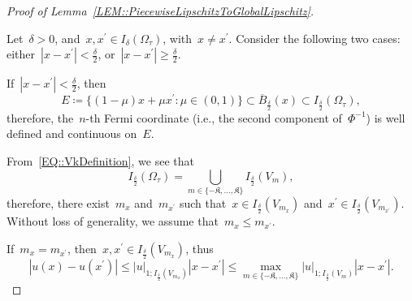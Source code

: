\documentclass[12pt,a4paper]{amsart}
\makeatletter
\numberwithin{equation}{section}
\theoremstyle{definition}
\theoremstyle{remark}
\newcommand{\abs}[1]{\left\lvert#1\right\rvert}
\renewcommand{\leq}{\leqslant}
\renewcommand{\geq}{\geqslant}
\newcommand{\prooflabel}[2]{%
  \def\@currentlabelname{#2}%
  \label{#1}%
}
\makeatother
\begin{document}
\begin{appendix}
\begin{proof}[Proof of Lemma~\ref{LEM::PiecewiseLipschitzToGlobalLipschitz}]\prooflabel{PRF::PiecewiseLipschitzToGlobalLipschitz}{Proof of Lemma~\ref{LEM::PiecewiseLipschitzToGlobalLipschitz}}
    Let~$\delta > 0$, and~$x,x^\prime \in I_\delta(\Omega_\tau)$, with~$x \neq x^\prime$. Consider the following two cases: either~$\abs{x-x^\prime} < \frac{\delta}{2}$, or~$\abs{x-x^\prime} \geq \frac{\delta}{2}$.

    If~$\abs{x-x^\prime} < \frac{\delta}{2}$, then
    \begin{equation}\label{EQ::SegmentIsInOmegaDeltaLipschitz}
        E \coloneq \bigg\{(1-\mu)x + \mu x^\prime \colon \mu \in (0,1)\bigg\} \subset \overline{B}_{\frac{\delta}{2}}(x) \subset I_{\frac{\delta}{2}}(\Omega_\tau),
    \end{equation}
    therefore, the~$n$-th Fermi coordinate (i.e., the second component of~$\Phi^{-1}$) is well defined and continuous on~$E$.

    From~\eqref{EQ::VkDefinition}, we see that
    \begin{equation}\label{EQ::OmegaDeltaVkPartitionLipschitz}
        I_{\frac{\delta}{2}}(\Omega_\tau) = \bigcup_{m \in \{-\mathfrak{K}, \dots, \mathfrak{K}\}}I_{\frac{\delta}{2}}(V_m),
    \end{equation}
    therefore, there exist~$m_x$ and~$m_{x^\prime}$ such that~$x \in I_{\frac{\delta}{2}}(V_{m_x})$ and~$x^\prime \in I_{\frac{\delta}{2}}(V_{m_{x^\prime}})$. Without loss of generality, we assume that~$m_x \leq m_{x^\prime}$.

    If~$m_x = m_{x^\prime}$, then~$x,x^\prime \in I_{\frac{\delta}{2}}(V_{m_x})$, thus
    \begin{equation}\label{EQ::xxPrimeNearSameVkLipschitz}
        \abs{u(x)-u(x^\prime)} \leq \abs{u}_{1; I_{\frac{\delta}{2}}(V_{m_x})} \abs{x-x^\prime} \leq \max_{m \in \{-\mathfrak{K},\dots,\mathfrak{K}\}} \abs{u}_{1; I_{\frac{\delta}{2}}(V_m)}\abs{x-x^\prime}.
    \end{equation}


\end{proof}
\end{appendix}
\end{document}
